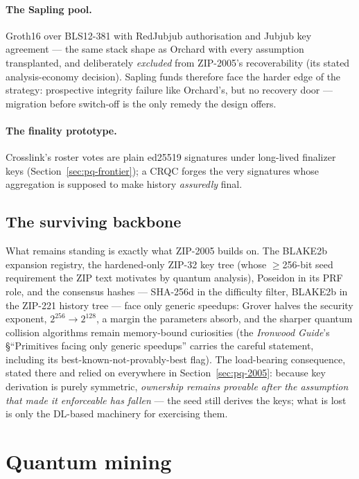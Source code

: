 \documentclass[11pt,a4paper]{article}
\theoremstyle{definition}
\begin{document}
\paragraph{The Sapling pool.} Groth16 over BLS12-381 with RedJubjub
authorisation and Jubjub key agreement --- the same stack shape as
Orchard with every assumption transplanted, and deliberately
\emph{excluded} from ZIP-2005's recoverability (its stated
analysis-economy decision). Sapling funds therefore face the harder
edge of the strategy: prospective integrity failure like Orchard's,
but no recovery door --- migration before switch-off is the only
remedy the design offers.

\paragraph{The finality prototype.} Crosslink's roster votes are plain
ed25519 signatures under long-lived finalizer keys
(Section~\ref{sec:pq-frontier}); a CRQC forges the very signatures
whose aggregation is supposed to make history \emph{assuredly} final.

\subsection{The surviving backbone}\label{sec:pq-backbone}

What remains standing is exactly what ZIP-2005 builds on. The BLAKE2b
expansion registry, the hardened-only ZIP-32 key tree (whose
$\geq$256-bit seed requirement the ZIP text motivates by quantum
analysis), Poseidon in its PRF role, and the consensus hashes ---
SHA-256d in the difficulty filter, BLAKE2b in the ZIP-221 history tree
--- face only generic speedups: Grover halves the security exponent,
$2^{256} \to 2^{128}$, a margin the parameters absorb, and the sharper
quantum collision algorithms remain memory-bound curiosities (the
\emph{Ironwood Guide}'s \S``Primitives facing only generic speedups''
carries the careful statement, including its best-known-not-provably-best
flag). The load-bearing consequence, stated there and relied on
everywhere in Section~\ref{sec:pq-2005}: because key derivation is
purely symmetric, \emph{ownership remains provable after the assumption
that made it enforceable has fallen} --- the seed still derives the
keys; what is lost is only the DL-based machinery for exercising them.

\section{Quantum mining}\label{sec:pq-mining}
\end{document}
